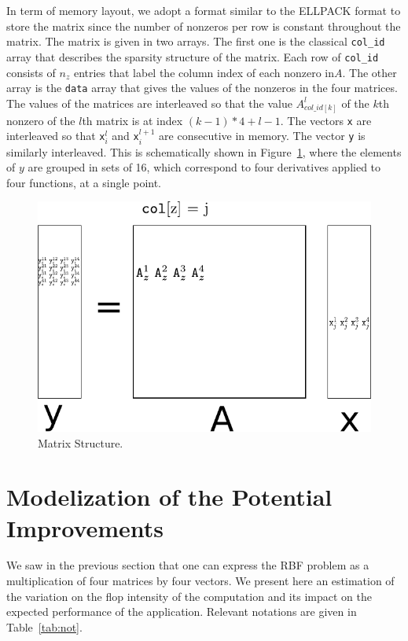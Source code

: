 \documentclass[10pt,conference,compsocconf]{IEEEtran}
\begin{document}
In term of memory layout, we adopt a format similar to the ELLPACK
format to store the matrix since the number of nonzeros per row is
constant throughout the matrix. The matrix is given in two arrays. The
first one is the classical {\tt col\_id} array that describes the
sparsity structure of the matrix. Each row of {\tt col\_id} consists of $n_z$
entries that label the column index of each nonzero in$A$. The
other array is the {\tt data} array that gives the values of the 
nonzeros in the four matrices. The values of the matrices are interleaved
so that the value $A^l_{col\_id[k]}$ of the $k$th nonzero of the
$l$th matrix is at index $(k-1)*4+l-1$. The vectors {\tt x} are 
interleaved so that {\tt x}$^l_i$ and {\tt x}$^{l+1}_i$ are
consecutive in memory. The vector {\tt y} is similarly
interleaved. This is schematically shown in Figure~\ref{fig:mat_struct}, 
where the elements of $y$ are grouped in sets of 16, which correspond
to four derivatives applied to four functions, at a single point. 

\begin{figure}
  \centering
  \includegraphics[width=\linewidth]{figures/matrix_not.pdf}
  \caption{Matrix Structure.}
  \label{fig:mat_struct}
\end{figure}


\section{Modelization of the Potential Improvements}
\label{sec:model}

We saw in the previous section that one can express the RBF problem as
a multiplication of four matrices by four vectors. We present here an
estimation of the variation on the flop intensity of the computation
and its impact on the expected performance of the
application. Relevant notations are given in Table~\ref{tab:not}.
\end{document}
